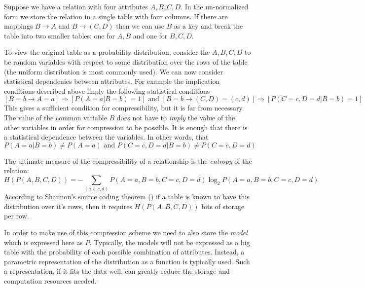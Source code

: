 Suppose we have a relation with four attributes $A,B,C,D$. In the
un-normalized form we store the relation in a single table with four
columns. If there are mappings $B \to A$ and $B \to (C,D)$ then we can
use $B$ as a key and break the table into two smaller tables: one for
$A,B$ and one for $B,C,D$. 

To view the original table as a probability distribution, consider the
$A,B,C,D$ to be random variables with respect to some distribution
over the rows of the table (the uniform distribution is most commonly
used). We can now consider statistical dependenies between
attributes. For example the implication conditions described above
imply the following statistical conditions
\[
\left[ B=b \to A=a\right] \Rightarrow \left[ P(A=a | B=b) =1 \right]
\mbox{ and }
\left[ B=b \to (C,D)=(c,d) \right] \Rightarrow \left[ P(C=c,D=d | B=b) =1 \right]
\]
This gives a sufficient condition for compressibility, but it is far
from necessary. The value of the common variable $B$ does not have 
to {\em imply} the value of the other variables in order for
compression to be possible. It is enough that there is a statistical
dependence between the variables. In other words, that
\[
P(A=a|B=b) \neq P(A=a) \mbox{ and } P(C=c,D=d|B=b) \neq P(C=c,D=d)
\]

The ultimate measure of the compressibility of a relationship is the
{\em entropy} of the relation:
\[
H(P(A,B,C,D))= - \sum_{(a,b,c,d)} P(A=a,B=b,C=c,D=d) \log_2 P(A=a,B=b,C=c,D=d)
\]
According to Shannon's source coding theorem (\cite{}) if a table is
known to have this distribution over it's rows, then it requires
$H(P(A,B,C,D))$ bits of storage per row.


In order to make use of this compression scheme we need to also store
the {\em model} which is expressed here as $P$. Typically, the models
will not be expressed as a big table with the probability of each
possible combination of attributes. Instead, a parametric
representation of the distribution as a function is typically
used. Such a representation, if it fits the data well, can greatly
reduce the storage and computation resources needed.


